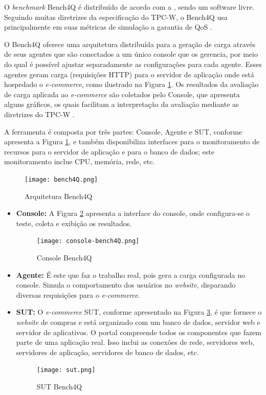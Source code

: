 O \textit{benchmark} Bench4Q é distribuído de acordo com a , sendo um software livre. Seguindo muitas diretrizes da especificação do TPC-W, o Bench4Q usa principalmente em suas métricas de simulação a garantia de QoS \cite{Bench4Q}. 

O Bench4Q oferece uma arquitetura distribuída para a geração de carga através de seus agentes que são conectados a um único console que os gerencia, por meio do qual é possível ajustar separadamente as configurações para cada agente. Esses agentes geram carga (requisições HTTP) para o servidor de aplicação onde está hospedado o \textit{e-commerce}, como ilustrado na Figura \ref{fig:arquitetura-bench4q}. Os resultados da avaliação de carga aplicada ao \textit{e-commerce} são coletados pelo Console, que apresenta alguns gráficos, os quais facilitam a interpretação da avaliação mediante as diretrizes do TPC-W \cite{Bench4Q}.

A ferramenta é composta por três partes: Console, Agente e SUT, conforme apresenta a Figura \ref{fig:arquitetura-bench4q}, e também disponibiliza interfaces para o monitoramento de recursos para o servidor de aplicação e para o banco de dados; este monitoramento inclue CPU, memória, rede, etc.


\begin{figure}[htb]
	\centering
	\texttt{[image: bench4Q.png]}
	\caption{Arquitetura Bench4Q}
	\label{fig:arquitetura-bench4q}
\end{figure}

\begin{itemize}
	
	\item \textbf{Console:} A Figura \ref{fig:console-bench4q} apresenta a interface do console, onde configura-se o teste, coleta e exibição os resultados. 
	
	\begin{figure}[!htb]
		\centering
		\texttt{[image: console-bench4Q.png]}
		\caption{Console Bench4Q}
		\label{fig:console-bench4q}
	\end{figure}
	
	\item \textbf{Agente:} É este que faz o trabalho real, pois gera a carga configurada no console. Simula o comportamento dos usuários no \textit{website}, disparando diversas requisições para o \textit{e-commerce}. 
	
	\item \textbf{SUT:} O \textit{e-commerce} SUT, conforme apresentado na Figura \ref{fig:sut}, é que fornece o \textit{website} de compras e está organizado com um banco de dados, servidor web e servidor de aplicativos. O portal compreende todos os componentes que fazem parte de uma aplicação real. Isso inclui as conexões de rede, servidores web, servidores de aplicação, servidores de banco de dados, etc.
	
	\begin{figure}[htb]
		\centering
		\texttt{[image: sut.png]}
		\caption{SUT Bench4Q}
		\label{fig:sut}
	\end{figure}
	
\end{itemize}

